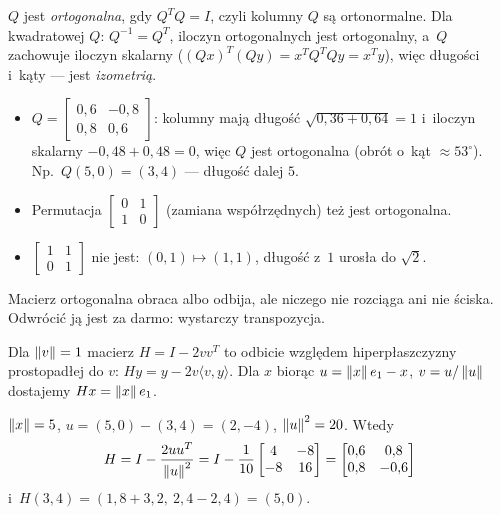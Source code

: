 \documentclass[11pt]{article}
\begin{document}
\begin{definicja}
$Q$ jest \emph{ortogonalna}, gdy $Q^TQ=I$, czyli kolumny $Q$ są
ortonormalne. Dla kwadratowej $Q$: $Q^{-1}=Q^T$, iloczyn ortogonalnych
jest ortogonalny, a~$Q$ zachowuje iloczyn skalarny
($(Qx)^T(Qy)=x^TQ^TQy=x^Ty$), więc długości i~kąty --- jest
\emph{izometrią}.
\end{definicja}

\begin{przyklad}
\begin{itemize}
\item $Q=\left[\begin{smallmatrix}0{,}6&-0{,}8\\0{,}8&0{,}6\end{smallmatrix}
\right]$: kolumny mają długość $\sqrt{0{,}36+0{,}64}=1$ i~iloczyn
skalarny $-0{,}48+0{,}48=0$, więc $Q$ jest ortogonalna (obrót o~kąt
$\approx53^\circ$). Np.\ $Q(5,0)=(3,4)$ --- długość dalej $5$.
\item Permutacja
$\left[\begin{smallmatrix}0&1\\1&0\end{smallmatrix}\right]$ (zamiana
współrzędnych) też jest ortogonalna.
\item $\left[\begin{smallmatrix}1&1\\0&1\end{smallmatrix}\right]$ nie
jest: $(0,1)\mapsto(1,1)$, długość z~$1$ urosła do $\sqrt2$.
\end{itemize}
\end{przyklad}

\begin{poludzku}
Macierz ortogonalna obraca albo odbija, ale niczego nie rozciąga ani nie
ściska. Odwrócić ją jest za darmo: wystarczy transpozycja.
\end{poludzku}

\begin{definicja}
Dla $\left\lVert v \right\rVert=1$ macierz $H=I-2vv^T$ to odbicie względem hiperpłaszczyzny
prostopadłej do $v$: $Hy=y-2v\langle v,y\rangle$. Dla $x$ biorąc
$u=\left\lVert x \right\rVert e_1-x$, $v=u/\left\lVert u \right\rVert$ dostajemy $Hx=\left\lVert x \right\rVert e_1$.
\end{definicja}

\begin{przyklad}
$\left\lVert x \right\rVert=5$, $u=(5,0)-(3,4)=(2,-4)$, $\left\lVert u \right\rVert^2=20$. Wtedy
\[
H=I-\frac{2uu^T}{\left\lVert u \right\rVert^2}
=I-\frac1{10}\begin{bmatrix}4&-8\\-8&16\end{bmatrix}
=\begin{bmatrix}0{,}6&0{,}8\\0{,}8&-0{,}6\end{bmatrix}
\]
i~$H(3,4)=(1{,}8+3{,}2,\ 2{,}4-2{,}4)=(5,0)$.
\end{przyklad}
\end{document}
